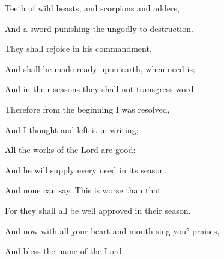 {\par }{\Q {}Teeth of wild beasts, and scorpions and adders,
\par }{\Q And a sword punishing the ungodly to destruction.
\par }{\Q {}They shall rejoice in his commandment,
\par }{\Q And shall be made ready upon earth, when need is;
\par }{\Q And in their seasons they shall not transgress
{} word.
\par }{\BB \par }{\Q {}Therefore from the beginning I was resolved,
\par }{\Q And I thought
{} and left it in writing;
\par }{\Q {}All the works of the Lord are good:
\par }{\Q And he will supply every need in its season.
\par }{\Q {}And none can say, This is worse than that:
\par }{\Q For they shall all be well approved in their season.
\par }{\Q {}And now with all your heart and mouth sing you° praises,
\par }{\Q And bless the name of the Lord.
\par }{\BB \par }
